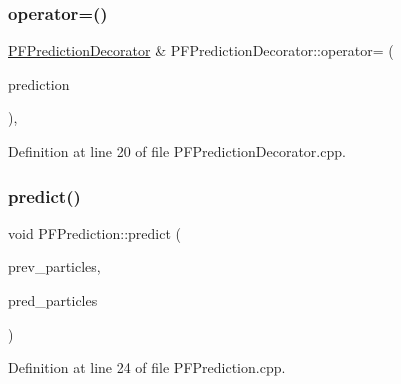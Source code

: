 \subsubsection{\texorpdfstring{operator=()}{operator=()}}
{\footnotesize\ttfamily \mbox{\hyperlink{classbfl_1_1PFPredictionDecorator}{P\+F\+Prediction\+Decorator}} \& P\+F\+Prediction\+Decorator\+::operator= (\begin{DoxyParamCaption}\item[{\mbox{\hyperlink{classbfl_1_1PFPredictionDecorator}{P\+F\+Prediction\+Decorator}} \&\&}]{prediction }\end{DoxyParamCaption})\hspace{0.3cm}{\ttfamily [protected]}, {\ttfamily [noexcept]}}



Definition at line 20 of file P\+F\+Prediction\+Decorator.\+cpp.

\mbox{\label{classbfl_1_1PFPrediction_a129dcd1cccd2da9827ef0c49c90b9345}} 
\subsubsection{\texorpdfstring{predict()}{predict()}}
{\footnotesize\ttfamily void P\+F\+Prediction\+::predict (\begin{DoxyParamCaption}\item[{const \mbox{\hyperlink{classbfl_1_1ParticleSet}{bfl\+::\+Particle\+Set}} \&}]{prev\+\_\+particles,  }\item[{\mbox{\hyperlink{classbfl_1_1ParticleSet}{bfl\+::\+Particle\+Set}} \&}]{pred\+\_\+particles }\end{DoxyParamCaption})\hspace{0.3cm}{\ttfamily [inherited]}}



Definition at line 24 of file P\+F\+Prediction.\+cpp.

\mbox{\label{classbfl_1_1PFPredictionDecorator_a570bd3a338034e65c1fa5abee429e717}} 
